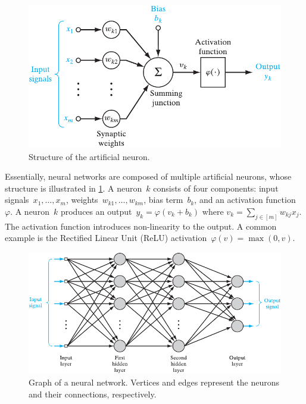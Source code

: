 \begin{figure}[tb]
    \caption{Structure of the artificial neuron.}
    \label{fig:neuron}
    \addmargin
    \centering
    \includegraphics[width=0.8\linewidth]{figures/neuron.pdf}
    \addmargin
\end{figure}

Essentially, neural networks are composed of multiple artificial neurons, whose structure is illustrated in \cref{fig:neuron}. A neuron~$k$ consists of four components: input signals~$x_1,\ldots,x_m$, weights~$w_{k1},\ldots,w_{km}$, bias term~$b_k$, and an activation function~$\varphi$. A neuron~$k$ produces an output~$y_k = \varphi(v_k + b_k)$ where $v_k = \sum_{j \in [m]} w_{kj} x_j$. The activation function introduces non-linearity to the output. A common example is the Rectified Linear Unit (ReLU) activation~$\varphi(v) = \max(0,v)$.

\begin{figure}[tb]
    \caption[Graph of a neural network.]{Graph of a neural network. Vertices and edges represent the neurons and their connections, respectively.}
    \label{fig:neuralnetwork}
    \addmargin
    \centering
    \includegraphics[width=0.9\linewidth]{figures/network.pdf}
    \addmargin
\end{figure}

